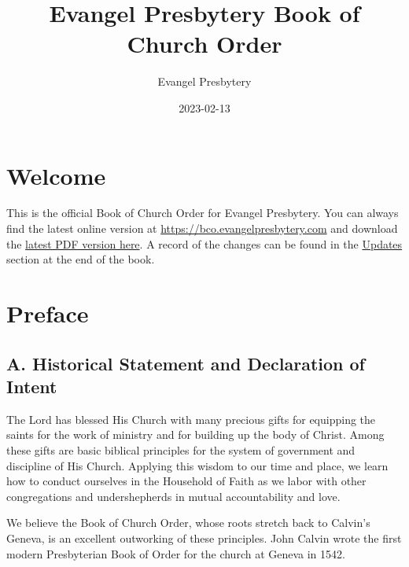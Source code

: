 \documentclass[
]{book}
\title{Evangel Presbytery Book of Church Order}
\author{Evangel Presbytery}
\date{2023-02-13}
\begin{document}
\maketitle



{
\hypersetup{linkcolor=}
\setcounter{tocdepth}{1}
\tableofcontents
}
\hypertarget{welcome}{%
\chapter*{Welcome}\label{welcome}}

This is the official Book of Church Order for Evangel Presbytery. You can always find the latest online version at \url{https://bco.evangelpresbytery.com} and download the \href{https://bco.evangelpresbytery.com/evangel-presbytery-bco.pdf}{latest PDF version here}. A record of the changes can be found in the \href{https://bco.evangelpresbytery.com/updates.html}{Updates} section at the end of the book.

\hypertarget{preface}{%
\chapter*{Preface}\label{preface}}

\protect\hypertarget{front-matter-preface}{\href{}{}}

\hypertarget{a.-historical-statement-and-declaration-of-intent}{%
\section*{A. Historical Statement and Declaration of Intent}\label{a.-historical-statement-and-declaration-of-intent}}

The Lord has blessed His Church with many precious gifts for equipping the saints for the work of ministry and for building up the body of Christ. Among these gifts are basic biblical principles for the system of government and discipline of His Church. Applying this wisdom to our time and place, we learn how to conduct ourselves in the Household of Faith as we labor with other congregations and undershepherds in mutual accountability and love.

We believe the Book of Church Order, whose roots stretch back to Calvin's Geneva, is an excellent outworking of these principles. John Calvin wrote the first modern Presbyterian Book of Order for the church at Geneva in 1542.
\end{document}

